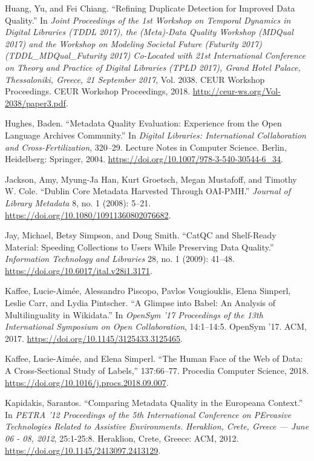 Huang, Yu, and Fei Chiang. “Refining Duplicate Detection for Improved Data Quality.” In \emph{Joint Proceedings of the 1st Workshop on Temporal Dynamics in Digital Libraries (TDDL 2017), the (Meta)-Data Quality Workshop (MDQual 2017) and the Workshop on Modeling Societal Future (Futurity 2017) (TDDL\_MDQual\_Futurity 2017) Co-Located with 21st International Conference on Theory and Practice of Digital Libraries (TPLD 2017), Grand Hotel Palace, Thessaloniki, Greece, 21 September 2017}, Vol. 2038. CEUR Workshop Proceedings. CEUR Workshop Proceedings, 2018. \url{http://ceur-ws.org/Vol-2038/paper3.pdf}.

Hughes, Baden. “Metadata Quality Evaluation: Experience from the Open Language Archives Community.” In \emph{Digital Libraries: International Collaboration and Cross-Fertilization}, 320–29. Lecture Notes in Computer Science. Berlin, Heidelberg: Springer, 2004. \url{https://doi.org/10.1007/978-3-540-30544-6_34}.

Jackson, Amy, Myung-Ja Han, Kurt Groetsch, Megan Mustafoff, and Timothy W. Cole. “Dublin Core Metadata Harvested Through OAI-PMH.” \emph{Journal of Library Metadata} 8, no. 1 (2008): 5–21. \url{https://doi.org/10.1080/10911360802076682}.

Jay, Michael, Betsy Simpson, and Doug Smith. “CatQC and Shelf-Ready Material: Speeding Collections to Users While Preserving Data Quality.” \emph{Information Technology and Libraries} 28, no. 1 (2009): 41–48. \url{https://doi.org/10.6017/ital.v28i1.3171}.

Kaffee, Lucie-Aimée, Alessandro Piscopo, Pavlos Vougiouklis, Elena Simperl, Leslie Carr, and Lydia Pintscher. “A Glimpse into Babel: An Analysis of Multilinguality in Wikidata.” In \emph{OpenSym ’17 Proceedings of the 13th International Symposium on Open Collaboration}, 14:1--14:5. OpenSym ’17. ACM, 2017. \url{https://doi.org/10.1145/3125433.3125465}.

Kaffee, Lucie-Aimée, and Elena Simperl. “The Human Face of the Web of Data: A Cross-Sectional Study of Labels,” 137:66–77. Procedia Computer Science, 2018. \url{https://doi.org/10.1016/j.procs.2018.09.007}.

Kapidakis, Sarantos. “Comparing Metadata Quality in the Europeana Context.” In \emph{PETRA ’12 Proceedings of the 5th International Conference on PErvasive Technologies Related to Assistive Environments. Heraklion, Crete, Greece — June 06 - 08, 2012}, 25:1-25:8. Heraklion, Crete, Greece: ACM, 2012. \url{https://doi.org/10.1145/2413097.2413129}.

